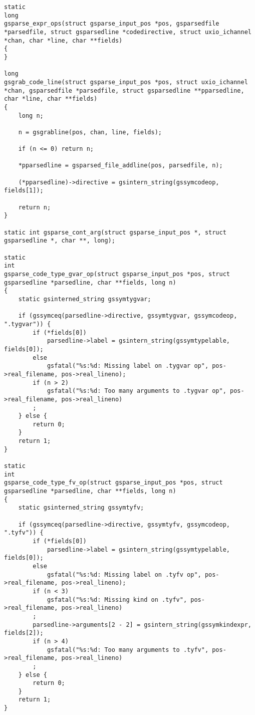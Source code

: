 \documentclass{report}
\begin{document}
\begin{verbatim}
static
long
gsparse_expr_ops(struct gsparse_input_pos *pos, gsparsedfile *parsedfile, struct gsparsedline *codedirective, struct uxio_ichannel *chan, char *line, char **fields)
{
}

long
gsgrab_code_line(struct gsparse_input_pos *pos, struct uxio_ichannel *chan, gsparsedfile *parsedfile, struct gsparsedline **pparsedline, char *line, char **fields)
{
    long n;

    n = gsgrabline(pos, chan, line, fields);

    if (n <= 0) return n;

    *pparsedline = gsparsed_file_addline(pos, parsedfile, n);

    (*pparsedline)->directive = gsintern_string(gssymcodeop, fields[1]);

    return n;
}

static int gsparse_cont_arg(struct gsparse_input_pos *, struct gsparsedline *, char **, long);

static
int
gsparse_code_type_gvar_op(struct gsparse_input_pos *pos, struct gsparsedline *parsedline, char **fields, long n)
{
    static gsinterned_string gssymtygvar;

    if (gssymceq(parsedline->directive, gssymtygvar, gssymcodeop, ".tygvar")) {
        if (*fields[0])
            parsedline->label = gsintern_string(gssymtypelable, fields[0]);
        else
            gsfatal("%s:%d: Missing label on .tygvar op", pos->real_filename, pos->real_lineno);
        if (n > 2)
            gsfatal("%s:%d: Too many arguments to .tygvar op", pos->real_filename, pos->real_lineno)
        ;
    } else {
        return 0;
    }
    return 1;
}

static
int
gsparse_code_type_fv_op(struct gsparse_input_pos *pos, struct gsparsedline *parsedline, char **fields, long n)
{
    static gsinterned_string gssymtyfv;

    if (gssymceq(parsedline->directive, gssymtyfv, gssymcodeop, ".tyfv")) {
        if (*fields[0])
            parsedline->label = gsintern_string(gssymtypelable, fields[0]);
        else
            gsfatal("%s:%d: Missing label on .tyfv op", pos->real_filename, pos->real_lineno);
        if (n < 3)
            gsfatal("%s:%d: Missing kind on .tyfv", pos->real_filename, pos->real_lineno)
        ;
        parsedline->arguments[2 - 2] = gsintern_string(gssymkindexpr, fields[2]);
        if (n > 4)
            gsfatal("%s:%d: Too many arguments to .tyfv", pos->real_filename, pos->real_lineno)
        ;
    } else {
        return 0;
    }
    return 1;
}


\end{verbatim}
\end{document}
